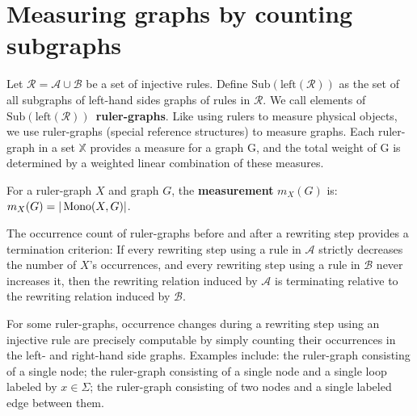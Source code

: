 
\section{Measuring graphs by counting subgraphs}
\label{sec:interpretation}
Let $\mathcal{R} = \mathcal{A} \cup \mathcal{B}$ be a set of injective rules.
Define $\mathrm{Sub}(\mathrm{left}(\mathcal{R}))$ as the set of all subgraphs of left-hand sides graphs of rules in $\mathcal{R}$.
We call elements of $\mathrm{Sub}(\mathrm{left}(\mathcal{R}))$~\textbf{ruler-graphs}. Like using rulers to measure physical objects, we use ruler-graphs (special reference structures) to measure graphs.
Each ruler-graph in a set $\mathbb{X}$ provides a measure for a graph
G, and the total weight of G is determined by a weighted linear
combination of these measures.

\begin{definition}
    For a ruler-graph \( X \) and graph \( G \), the \textbf{measurement} \( m_X(G) \) is:
    \(
        m_X(G) = |\operatorname{Mono}(X, G)|
    \).
\end{definition} 
The occurrence count of ruler-graphs before and after a rewriting step provides a termination criterion: 
    If every rewriting step using a rule in $\mathcal{A}$ strictly decreases the number of $X$'s occurrences, and every rewriting step using a rule in $\mathcal{B}$ never increases it, then the rewriting relation induced by $\mathcal{A}$ is terminating relative to the rewriting relation induced by $\mathcal{B}$.
 
For some ruler-graphs, occurrence changes during a rewriting step using an injective rule are precisely computable by simply counting their occurrences in the left- and right-hand side graphs. Examples include: the ruler-graph  consisting of a single node; the ruler-graph  consisting of a single node and a single loop labeled by $x\in \Sigma$; the ruler-graph  consisting of two nodes and a single labeled edge between them.  
    
